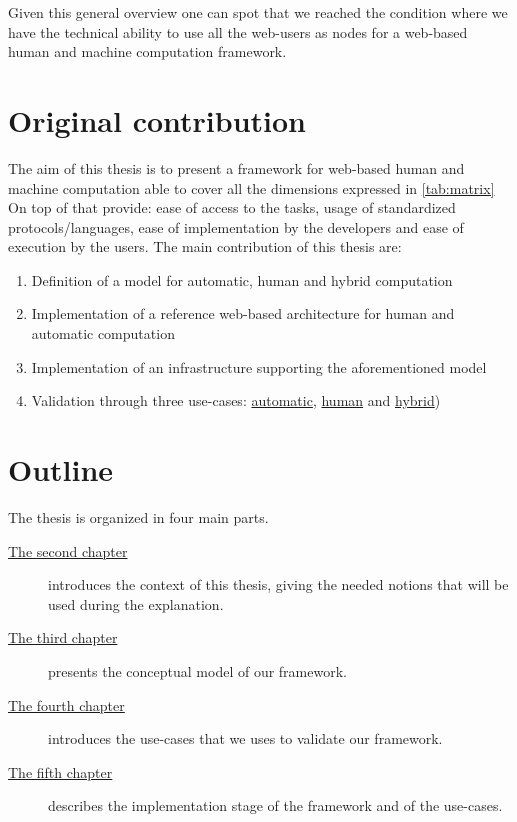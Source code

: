 Given this general overview one can spot that we reached the condition where we
have the technical ability to use all the web-users as nodes for a web-based human
and machine computation framework.

\section{Original contribution}
The aim of this thesis is to present a framework for web-based human and machine
computation able to cover all the dimensions expressed in \autoref{tab:matrix}
On top of that provide: ease of access to the tasks, usage of
standardized protocols/languages, ease of implementation by the developers and
ease of execution by the users. The main contribution of this thesis are:
\begin{enumerate}
	\item Definition of a model for automatic, human and hybrid computation
	\item Implementation of a reference web-based architecture for human and
	automatic computation
	\item Implementation of an infrastructure supporting the aforementioned model
	\item Validation through three use-cases:
	\hyperref[sec:cases:automatic]{automatic}, \hyperref[sec:cases:human]{human}
	and \hyperref[sec:cases:hybrid]{hybrid})
\end{enumerate}







\section{Outline}
The thesis is organized in four main parts.
\begin{description}
	\item[{\hyperref[cap:bg]{The second chapter}}] introduces the context of this
	thesis, giving the needed notions that will be used during the explanation.

	\item[{\hyperref[cap:model]{The third chapter}}] presents the conceptual model
	of our framework.

	\item[{\hyperref[cap:cases]{The fourth chapter}}] introduces the use-cases
	that we uses to validate our framework.

	\item[{\hyperref[cap:implementation]{The fifth chapter}}] describes the
	implementation stage of the framework and of the use-cases.
\end{description}